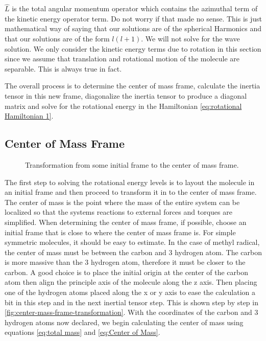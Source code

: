 \documentclass[11pt,a4paper]{book}
\newcommand{\imginput}[1]{} %
\begin{document}
			$\hat{L}$ is the total angular momentum operator which contains the azimuthal term of the kinetic energy operator term. Do not worry if that made no sense. This is just  mathematical way of saying that our solutions are of the spherical Harmonics and that our solutions are of the form $l(l+1)$. We will not solve for the wave solution. We only consider the kinetic energy terms due to rotation in this section since we assume that translation and rotational motion of the molecule are separable. This is always true in fact. 
			
			The overall process is to determine the center of mass frame, calculate the inertia tensor in this new frame, diagonalize the inertia tensor to produce a diagonal matrix and solve for the rotational energy in the Hamiltonian \autoref{eq:rotational Hamiltonian 1}. 			
			
		\subsection{Center of Mass Frame}
			\label{subsec:Center of Mass Frame}
			
			\begin{figure} [!ht]
				\centering
				\Large
				\def\svgwidth{\columnwidth}
				\resizebox{14cm}{!}{\imginput{images/center-mass-frame-transformation.pdf_tex}}
				\caption{Transformation from some initial frame to the center of mass frame.}
				\label{fig:center-mass-frame-transformation}
			\end{figure}	
			
			The first step to solving the rotational energy levels is to layout the molecule in an initial frame and then proceed to transform it in to the center of mass frame. The center of mass is the point where the mass of the entire system can be localized so that the systems reactions to external forces and torques are simplified. When determining the center of mass frame, if possible, choose an initial frame that is close to where the center of mass frame is. For simple symmetric molecules, it should be easy to estimate. In the case of methyl radical, the center of mass must be between the carbon and 3 hydrogen atom. The carbon is more massive than the 3 hydrogen atom, therefore it must be closer to the carbon. A good choice is to place the initial origin at the center of the carbon atom then align the principle axis of the molecule along the z axis. Then placing one of the hydrogen atoms placed along the x or y axis to ease the calculation a bit in this step and in the next inertial tensor step. This is shown step by step in \autoref{fig:center-mass-frame-transformation}. With the coordinates of the carbon and 3 hydrogen atoms now declared, we begin calculating the center of mass using equations \autoref{eq:total mass} and  \autoref{eq:Center of Mass}.
			
\end{document}
